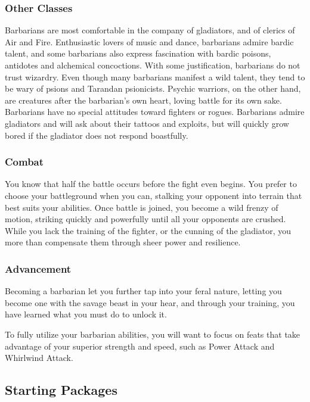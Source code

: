 \subsubsection{Other Classes}

Barbarians are most comfortable in the company of gladiators, and of clerics of Air and Fire. Enthusiastic lovers of music and dance, barbarians admire bardic talent, and some barbarians also express fascination with bardic poisons, antidotes and alchemical concoctions. With some justification, barbarians do not trust wizardry. Even though many barbarians manifest a wild talent, they tend to be wary of psions and Tarandan psionicists. Psychic warriors, on the other hand, are creatures after the barbarian's own heart, loving battle for its own sake. Barbarians have no special attitudes toward fighters or rogues. Barbarians admire gladiators and will ask about their tattoos and exploits, but will quickly grow bored if the gladiator does not respond boastfully.

\subsubsection{Combat}

You know that half the battle occurs before the fight even begins. You prefer to choose your battleground when you can, stalking your opponent into terrain that best suits your abilities. Once battle is joined, you become a wild frenzy of motion, striking quickly and powerfully until all your opponents are crushed. While you lack the training of the fighter, or the cunning of the gladiator, you more than compensate them through sheer power and resilience.

\subsubsection{Advancement}

Becoming a barbarian let you further tap into your feral nature, letting you become one with the savage beast in your hear, and through your training, you have learned what you must do to unlock it.

To fully utilize your barbarian abilities, you will want to focus on feats that take advantage of your superior strength and speed, such as Power Attack and Whirlwind Attack.

\subsection{Starting Packages}
